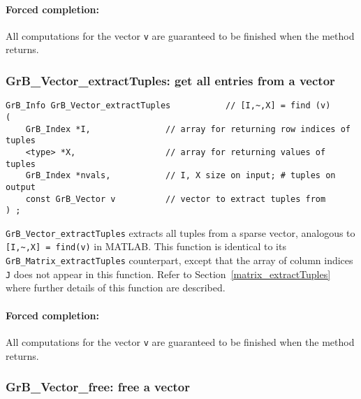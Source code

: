 \documentclass[12pt]{article}
\begin{document}
\paragraph{Forced completion:}
All computations for the vector \verb'v' are
guaranteed to be finished when the method returns.

\newpage
\subsubsection{{\sf GrB\_Vector\_extractTuples:} get all entries from a vector}
\label{vector_extractTuples}

\begin{mdframed}[userdefinedwidth=6in]
{\footnotesize
\begin{verbatim}
GrB_Info GrB_Vector_extractTuples           // [I,~,X] = find (v)
(
    GrB_Index *I,               // array for returning row indices of tuples
    <type> *X,                  // array for returning values of tuples
    GrB_Index *nvals,           // I, X size on input; # tuples on output
    const GrB_Vector v          // vector to extract tuples from
) ;
\end{verbatim} } \end{mdframed}

\verb'GrB_Vector_extractTuples' extracts all tuples from a sparse vector,
analogous to \verb'[I,~,X] = find(v)' in MATLAB.  This function is identical to
its \verb'GrB_Matrix_extractTuples' counterpart, except that the array of
column indices \verb'J' does not appear in this function.  Refer to
Section~\ref{matrix_extractTuples} where further details of this function are
described.

\paragraph{Forced completion:}
All computations for the vector \verb'v' are
guaranteed to be finished when the method returns.

\subsubsection{{\sf GrB\_Vector\_free:}          free a vector}
\label{vector_free}
\end{document}
